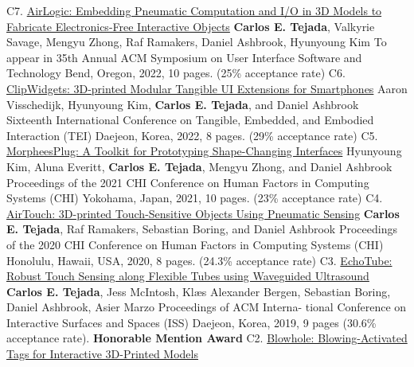 


    \begin{cvpublications}
      \cvpublication%
        {C7.}%
        {\href{https://doi.org/10.1145/3526113.3545642}{AirLogic: Embedding Pneumatic Computation and I/O in 3D Models to Fabricate Electronics-Free Interactive Objects}
        {\textbf{Carlos E. Tejada}, Valkyrie Savage, Mengyu Zhong, Raf Ramakers, Daniel Ashbrook, Hyunyoung Kim}
        {To appear in 35th Annual ACM Symposium on User Interface Software and Technology}
        {Bend, Oregon, 2022, 10 pages. (25\% acceptance rate)}
      \cvpublication%
        {C6.}%
        {\href{https://doi.org/10.1145/3490149.3501314}{ClipWidgets: 3D-printed Modular Tangible UI Extensions for Smartphones}
        {Aaron Visschedijk, Hyunyoung Kim, \textbf{Carlos E. Tejada}, and Daniel Ashbrook}%
        {Sixteenth International Conference on Tangible, Embedded, and Embodied Interaction (TEI)}
        {Daejeon, Korea, 2022, 8 pages. (29\% acceptance rate)}
      \cvpublication%
        {C5.}%
        {\href{https://doi.org/10.1145/3313831.3376136}{MorpheesPlug: A Toolkit for Prototyping Shape-Changing Interfaces}}%
        {Hyunyoung Kim, Aluna Everitt, \textbf{Carlos E. Tejada}, Mengyu Zhong, and Daniel Ashbrook}%
        {Proceedings of the 2021 CHI Conference on Human Factors in Computing Systems (CHI)}%
        {Yokohama, Japan, 2021, 10 pages. (23\% acceptance rate)}
      \cvpublication%
        {C4.}%
        {\href{https://doi.org/10.1145/3313831.3376136}{AirTouch: 3D-printed Touch-Sensitive Objects Using Pneumatic Sensing}}%
        {\textbf{Carlos E. Tejada}, Raf Ramakers, Sebastian Boring, and Daniel Ashbrook}%
        {Proceedings of the 2020 CHI Conference on Human Factors in Computing Systems (CHI)}%
        {Honolulu, Hawaii, USA, 2020, 8 pages. (24.3\% acceptance rate)}
      \cvpublication%
        {C3.}
        {\href{https://doi.org/10.1145/3343055.3359712}{EchoTube: Robust Touch Sensing along Flexible Tubes using Waveguided Ultrasound}}%
        {\textbf{Carlos E. Tejada}, Jess McIntosh, Klæs Alexander Bergen, Sebastian Boring, Daniel Ashbrook, Asier Marzo}%
        {Proceedings of ACM Interna- tional Conference on Interactive Surfaces and Spaces (ISS)}%
        {Daejeon, Korea, 2019, 9 pages (30.6\% acceptance rate). \bf Honorable Mention Award}
      \cvpublication%
        {C2.}%
        {\href{https://doi.org/10.20380/GI2018.18}{Blowhole: Blowing-Activated Tags for Interactive 3D-Printed Models}}%
}}
\end{cvpublications}
